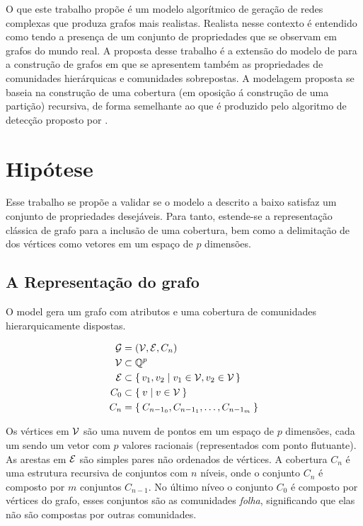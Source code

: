 \documentclass[notes.tex]{subfiles}
\begin{document}
O que este trabalho propõe é um modelo algorítmico de geração de redes complexas que produza grafos mais realistas.
Realista nesse contexto é entendido como tendo a presença de um conjunto de propriedades que se observam em grafos do mundo real.
A proposta desse trabalho é a extensão do modelo de  para a construção de grafos em que se apresentem também as propriedades de comunidades hierárquicas e comunidades sobrepostas.
A modelagem proposta se baseia na construção de uma cobertura (em oposição á construção de uma partição) recursiva, de forma semelhante ao que é produzido pelo algoritmo de detecção proposto por .


\section{Hipótese}

Esse trabalho se propõe a validar se o modelo a descrito a baixo satisfaz um conjunto de propriedades desejáveis.
Para tanto, estende-se a representação clássica de grafo para a inclusão de uma cobertura, bem como a delimitação de dos vértices como vetores em um espaço de $p$ dimensões.

\subsection{A Representação do grafo}

O model gera um grafo com atributos e uma cobertura de comunidades hierarquicamente dispostas.

\begin{equation}
\begin{split}
    \operatorname{\mathcal{G}} &= (\operatorname{\mathcal{V}}, \operatorname{\mathcal{E}}, C_n) \\
    \operatorname{\mathcal{V}} &\subset  \mathbb{Q}^{p} \\
    \operatorname{\mathcal{E}} &\subset \set{v_1, v_2 | v_1 \in \operatorname{\mathcal{V}}, v_2 \in \operatorname{\mathcal{V}}} \\
     C_0 &\subset \Set{v | v \in \operatorname{\mathcal{V}}} \\
     C_n &= \Set{C_{n-1_0}, C_{n-1_1}, \ldots, C_{n-1_m}} \\
\end{split}
\end{equation}

Os vértices em $\operatorname{\mathcal{V}}$ são uma nuvem de pontos em um espaço de $p$ dimensões, cada um sendo um vetor com $p$ valores racionais (representados com ponto flutuante).
As arestas em $\operatorname{\mathcal{E}}$ são simples pares não ordenados de vértices.
A cobertura $C_n$ é uma estrutura recursiva de conjuntos com $n$ níveis, onde o conjunto $C_n$ é composto por $m$ conjuntos $C_{n-1}$.
No último níveo o conjunto $C_0$ é composto por vértices do grafo, esses conjuntos são as comunidades \emph{folha}, significando que elas não são compostas por outras comunidades.
\end{document}
